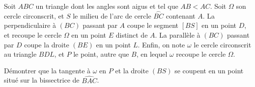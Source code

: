 Soit $ABC$ un triangle dont les angles sont aigus et tel que $AB < AC$. Soit $\Omega$ son cercle
circonscrit, et $S$ le milieu de l'arc de cercle $\overset{\frown}{BC}$ contenant $A$. La perpendiculaire à
$(BC)$ passant par $A$ coupe le segment $[BS]$ en un point $D$, et recoupe le cercle $\Omega$ en un point
$E$ distinct de $A$. La parallèle à $(BC)$ passant par $D$ coupe la droite $(BE)$ en un point $L$. Enfin,
on note $\omega$ le cercle circonscrit au triangle $BDL$, et $P$ le point, autre que $B$, en lequel
$\omega$ recoupe le cercle $\Omega$.

Démontrer que la tangente à $\omega$ en $P$ et la droite $(BS)$ se coupent en un point situé sur la
bissectrice de $\widehat{BAC}$.
